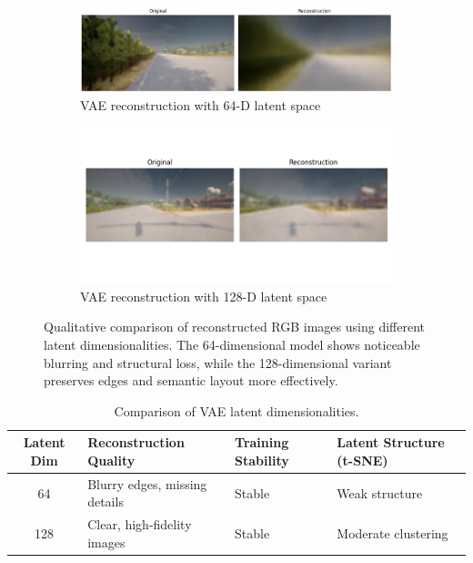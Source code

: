 \begin{figure}[htbp]
    \centering
    \begin{subfigure}[b]{0.6\textwidth}
        \includegraphics[width=\textwidth]{img/vae_results/epoch_200.png}
        \caption{VAE reconstruction with 64-D latent space}
        \label{fig:vae64_recon}
    \end{subfigure}
    \hfill
    \begin{subfigure}[b]{0.6\textwidth}
        \includegraphics[width=\textwidth]{img/vae_results/200_epochs_128_ls_logcosh/reconstructions/epoch_200.png}
        \caption{VAE reconstruction with 128-D latent space}
        \label{fig:vae128_recon}
    \end{subfigure}

    \caption[Reconstruction comparison for different VAE latent dimensions]{%
Qualitative comparison of reconstructed RGB images using different latent dimensionalities. The 64-dimensional model shows noticeable blurring and structural loss, while the 128-dimensional variant preserves edges and semantic layout more effectively.}
    \label{fig:vae_latent_qual_comparison}
\end{figure}

\begin{table}[!h]
    \centering
    \caption{Comparison of VAE latent dimensionalities.}
    \label{tab:vae-latent-comparison}
    \begin{tabular}{|c|p{4cm}|p{3.5cm}|p{4cm}|}
        \hline
        \textbf{Latent Dim} & \textbf{Reconstruction Quality} & \textbf{Training Stability} & \textbf{Latent Structure (t-SNE)} \\
        \hline
        64 & Blurry edges, missing details & Stable & Weak structure \\
        128 & Clear, high-fidelity images & Stable & Moderate clustering \\
        \hline
    \end{tabular}
\end{table}

